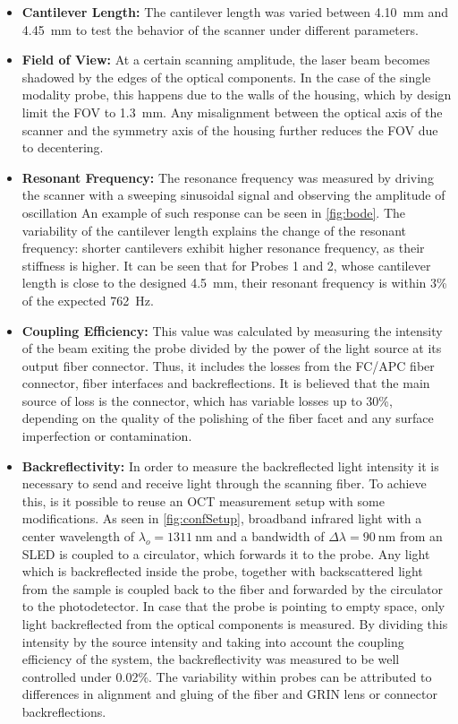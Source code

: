 \begin{itemize}


\item \textbf{Cantilever Length:} The cantilever length was varied between \SI{4.10}{\milli\meter} and \SI{4.45}{\milli\meter} to test the behavior of the scanner under different parameters. 

\item \textbf{Field of View:} At a certain scanning amplitude, the laser beam becomes shadowed by the edges of the optical components. In the case of the single modality probe, this happens due to the walls of the housing, which by design limit the FOV to \SI{1.3}{\milli\meter}. Any misalignment between the optical axis of the scanner and the symmetry axis of the housing further reduces the FOV due to decentering.

\item \textbf{Resonant Frequency:} The resonance frequency was measured by driving the scanner with a sweeping sinusoidal signal and observing the amplitude of oscillation An example of such response can be seen in \autoref{fig:bode}. The variability of the cantilever length explains the change of the resonant frequency: shorter cantilevers exhibit higher resonance frequency, as their stiffness is higher. It can be seen that for Probes 1 and 2, whose cantilever length is close to the designed \SI{4.5}{\milli\meter}, their resonant frequency is within 3\% of the expected \SI{762}{\hertz}. 

\item \textbf{Coupling Efficiency:} This value was calculated by measuring the intensity of the beam exiting the probe divided by the power of the light source at its output fiber connector. Thus, it includes the losses from the FC/APC fiber connector, fiber interfaces and backreflections. It is believed that the main source of loss is the connector, which has variable losses up to 30\%, depending on the quality of the polishing of the fiber facet and any surface imperfection or contamination. 

\item \textbf{Backreflectivity:} In order to measure the backreflected light intensity it is necessary to send and receive light through the scanning fiber. To achieve this, is it possible to reuse an OCT measurement setup with some modifications. As seen in \autoref{fig:confSetup}, broadband infrared light with a center wavelength of $\lambda_o = \SI{1311}{\nano\meter}$ and a bandwidth of $\Delta \lambda = \SI{90}{\nano\meter} $ from an SLED is coupled to a circulator, which forwards it to the probe. Any light which is backreflected inside the probe, together with backscattered light from the sample is coupled back to the fiber and forwarded by the circulator to the photodetector. In case that the probe is pointing to empty space, only light backreflected from the optical components is measured. By dividing this intensity by the source intensity and taking into account the coupling efficiency of the system, the backreflectivity was measured to be well controlled under 0.02\%. The variability within probes can be attributed to differences in alignment and gluing of the fiber and GRIN lens or connector backreflections.


\end{itemize}
